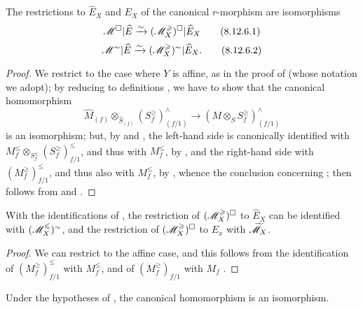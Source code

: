 \begin{proposition}[8.12.6]
\label{II.8.12.6}
The restrictions to $\widehat{E}_X$ and $E_X$ of the canonical $r$-morphism  are isomorphisms
\[
\label{II.8.12.6.1}
    \mathscr{M}^\square|\widehat{E} \xrightarrow{\sim} (\mathscr{M}_X^\geqslant)^\square|\widehat{E}_X
\tag{8.12.6.1}
\]
\[
\label{II.8.12.6.2}
    \mathscr{M}^\sim|\widehat{E} \xrightarrow{\sim} (\mathscr{M}_X^\geqslant)^\sim|\widehat{E}_X.
\tag{8.12.6.2}
\]
\end{proposition}

\begin{proof}
\label{proof-II.8.12.6}
We restrict to the case where $Y$ is affine, as in the proof of  (whose notation we adopt);
by reducing to definitions , we have to show that the canonical homomorphism
\[
    \widehat{M}_{(f)}\otimes_{\widehat{S}_{(f)}}(S_f^\geq)_{(f/1)}^\wedge \to (M\otimes_S S_f^\geq)_{(f/1)}^\wedge
\]
is an isomorphism;
but, by  and , the left-hand side is canonically identified with $M_f^\leq\otimes_{S_f^\leq}(S_f^\geq)_{f/1}^\leq$, and thus with $M_f^\leq$, by , and the right-hand side with $(M_f^\geq)_{f/1}^\leq$, and thus also with $M_f^\leq$, by , whence the conclusion concerning ;
 then follows from  and .
\end{proof}

\begin{corollary}[8.12.7]
\label{II.8.12.7}
With the identifications of , the restriction of $(\mathscr{M}_X^\geqslant)^\square$ to $\widehat{E}_X$ can be identified with $(\mathscr{M}_X^\leqslant)^\sim$, and the restriction of $(\mathscr{M}_X^\geqslant)^\square$ to $E_x$ with $\widetilde{\mathscr{M}}_X$.
\end{corollary}

\begin{proof}
\label{proof-II.8.12.7}
We can restrict to the affine case, and this follows from the identification of $(M_f^\geq)_{f/1}^\leq$ with $M_f^\leq$, and of $(M_f^\geq)_{f/1}$ with $M_f$ .
\end{proof}

\begin{proposition}[8.12.8]
\label{II.8.12.8}
Under the hypotheses of , the canonical homomorphism  is an isomorphism.
\end{proposition}

